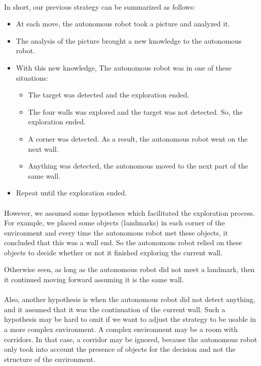 \documentclass[12pt]{report}
\begin{document}
	\paragraph{}
	In short, our previous strategy can be summarized as follows:
	\begin{itemize}
		\item At each move, the autonomous robot took a picture and analyzed it.
		\item The analysis of the picture brought a new knowledge to the autonomous robot.
		\item With this new knowledge, The autonomous robot was in one of these situations:
		\begin{itemize}
			\item The target was detected and the exploration ended.
			\item The four walls was explored and the target was not detected. So, the exploration ended.
			\item A corner was detected. As a result, the autonomous robot went on the next wall.
			\item Anything was detected, the autonomous moved to the next part of the same wall.
		\end{itemize}
		\item Repeat until the exploration ended.
	\end{itemize}

	\paragraph{}
	However, we assumed some hypotheses which facilitated the exploration process. For example, we placed some objects (landmarks) in each corner of the environment and every time the autonomous robot met these objects, it concluded that this was a wall end. So the autonomous robot relied on these objects to decide whether or not it finished exploring the current wall.
	
	Otherwise seen, as long as the autonomous robot did not meet a landmark, then it continued moving forward assuming it is the same wall.
	
	\paragraph{}
	Also, another hypothesis is when the autonomous robot did not detect anything, and it assumed that it was the continuation of the current wall. Such a hypothesis may be hard to omit if we want to adjust the strategy to be usable in a more complex environment. A complex environment may be a room with corridors. In that case, a corridor may be ignored, because the autonomous robot only took into account the presence of objects for the decision and not the structure of the environment.
	
\end{document}
